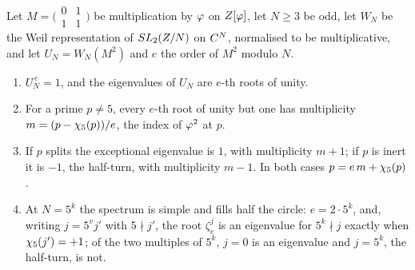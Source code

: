 \begin{proposition}\label{prop:index-degeneracy}
Let $M=\bigl(\begin{smallmatrix}0&1\\1&1\end{smallmatrix}\bigr)$ be multiplication by $\varphi$ on $Z[\varphi]$, let
$N\ge3$ be odd, let $W_N$ be the Weil representation of $SL_2(Z/N)$ on $C^N$, normalised to be
multiplicative, and let $U_N=W_N(M^2)$ and $e$ the order of $M^2$ modulo $N$.
\begin{enumerate}[label=\textup{(\roman*)}]
  \item $U_N^{\,e}=1$, and the eigenvalues of $U_N$ are $e$-th roots of unity.
  \item For a prime $p\ne5$, every $e$-th root of unity but one has multiplicity $m=(p-\chi_5(p))/e$, the index of
    $\varphi^2$ at $p$.
  \item If $p$ splits the exceptional eigenvalue is $1$, with multiplicity $m+1$; if $p$ is inert it is $-1$, the
    half-turn, with multiplicity $m-1$.  In both cases $p=e\,m+\chi_5(p)$.
  \item At $N=5^k$ the spectrum is simple and fills half the circle: $e=2\cdot5^k$, and, writing $j=5^vj'$ with
    $5\nmid j'$, the root $\zeta_e^j$ is an eigenvalue for $5^k\nmid j$ exactly when $\chi_5(j')=+1$; of the two
    multiples of $5^k$, $j=0$ is an eigenvalue and $j=5^k$, the half-turn, is not.
\end{enumerate}
\end{proposition}

